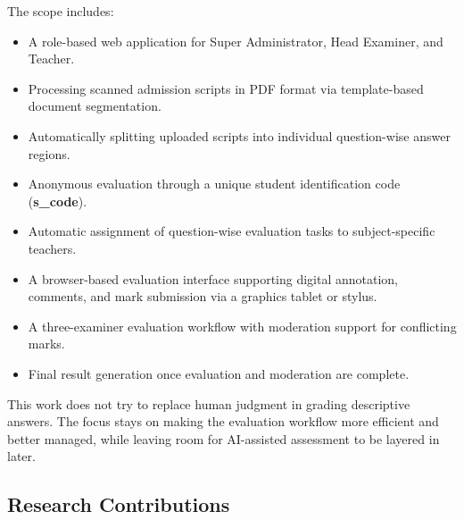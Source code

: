 The scope includes:

\begin{itemize}

\item A role-based web application for Super Administrator, Head Examiner, and Teacher.

\item Processing scanned admission scripts in PDF format via template-based document segmentation.

\item Automatically splitting uploaded scripts into individual question-wise answer regions.

\item Anonymous evaluation through a unique student identification code (\textbf{s\_code}).

\item Automatic assignment of question-wise evaluation tasks to subject-specific teachers.

\item A browser-based evaluation interface supporting digital annotation, comments, and mark submission via a graphics tablet or stylus.

\item A three-examiner evaluation workflow with moderation support for conflicting marks.

\item Final result generation once evaluation and moderation are complete.

\end{itemize}

This work does not try to replace human judgment in grading descriptive answers. The focus stays on making the evaluation workflow more efficient and better managed, while leaving room for AI-assisted assessment to be layered in later.

\subsection{Research Contributions}

